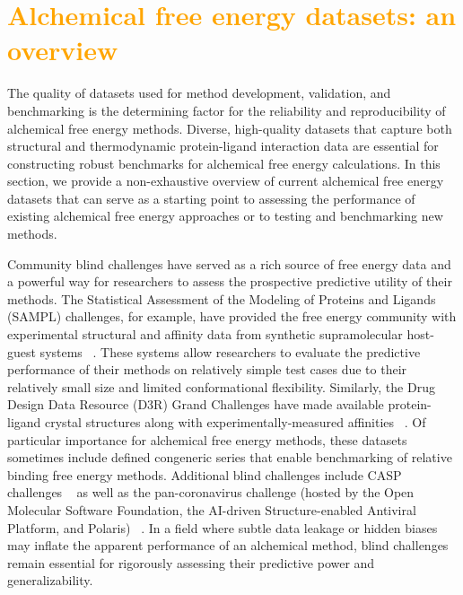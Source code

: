 \documentclass[9pt,bestpractices,pubversion]{livecoms}
\makeatletter
\newcommand{\tocorange}[1]{\textcolor{orange}{#1}}
\newcommand{\tocsectioncomment}[1]{%
  \addtocontents{toc}{%
    {\leftskip \cftsecindent\relax
     \advance\leftskip \cftsecnumwidth\relax
     \rightskip \@tocrmarg\relax
     \textit{#1}\protect\par}}%
  \textit{#1}\par}
\makeatother
\begin{document}
\section{\tocorange{Alchemical free energy datasets: an overview}}
\label{sec:benchmark}
The quality of datasets used for method development, validation, and benchmarking is the determining factor for the reliability and reproducibility of alchemical free energy methods. Diverse, high-quality datasets that capture both structural and thermodynamic protein-ligand interaction data are essential for constructing robust benchmarks for alchemical free energy calculations. In this section, we provide a non-exhaustive overview of current alchemical free energy datasets that can serve as a starting point to assessing the performance of existing alchemical free energy approaches or to testing and benchmarking new methods. 

Community blind challenges have served as a rich source of free energy data and a powerful way for researchers to assess the prospective predictive utility of their methods. The Statistical Assessment of the Modeling of Proteins and Ligands (SAMPL) challenges, for example, have provided the free energy community with experimental structural and affinity data from synthetic supramolecular host-guest systems ~\cite{
amezcua_sampl9_2024, amezcua_overview_2022, amezcua_sampl7_2021, rizzi_overview_2018, yin_overview_2017, muddana_sampl4_2014}. These systems allow researchers to evaluate the predictive performance of their methods on relatively simple test cases due to their relatively small size and limited conformational flexibility. Similarly, the Drug Design Data Resource (D3R) Grand Challenges have made available protein-ligand crystal structures along with experimentally-measured affinities ~\cite{parks_d3r_2020, gaieb_d3r_2019, gaieb_d3r_2018, gathiaka_d3r_2016}. Of particular importance for alchemical free energy methods, these datasets sometimes include defined congeneric series that enable benchmarking of relative binding free energy methods. Additional blind challenges include CASP challenges ~\cite{gilson_assessment_2025} as well as the pan-coronavirus challenge (hosted by the Open Molecular Software Foundation, the AI-driven Structure-enabled Antiviral Platform, and Polaris) ~\cite{macdermott-opeskin_computational_2025}. In a field where subtle data leakage or hidden biases may inflate the apparent performance of an alchemical method, blind challenges remain essential for rigorously assessing their predictive power and generalizability. 
\end{document}
